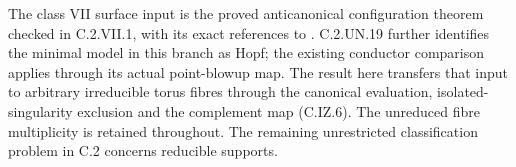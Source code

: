 The class VII surface input is the proved anticanonical
configuration theorem checked in C.2.VII.1, with its exact
references to \cite{Dloussky2006,DOT2003}. C.2.UN.19 further
identifies the minimal model in this branch as Hopf;
the existing conductor comparison applies through its
actual point-blowup map. The result here
transfers that input to arbitrary irreducible torus fibres
through the canonical evaluation, isolated-singularity
exclusion and the complement map (C.IZ.6). The unreduced
fibre multiplicity is retained throughout. The remaining
unrestricted classification problem in C.2 concerns
reducible supports.
